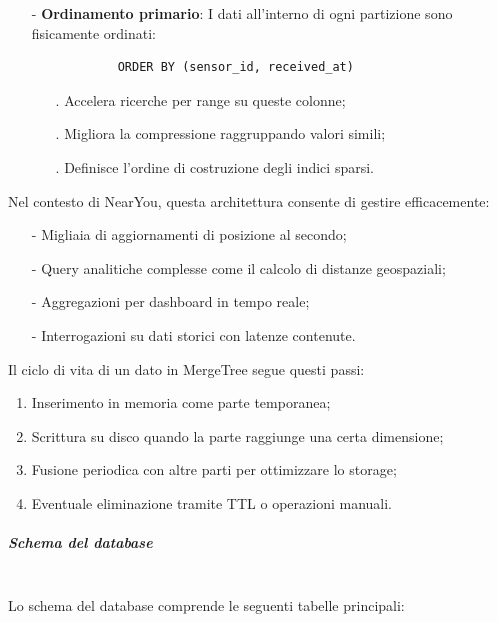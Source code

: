 \documentclass[10pt]{article}
\newcommand{\mysubparagraph}[1]{\subparagraph{#1}\mbox{}\\}
\begin{document}
\begin{itemize}
            \item[-] \textbf{Ordinamento primario}: I dati all'interno di ogni partizione sono fisicamente ordinati:
            \begin{lstlisting}
            ORDER BY (sensor_id, received_at)
            \end{lstlisting}
            \begin{itemize}
                \item[.] Accelera ricerche per range su queste colonne;
                \item[.] Migliora la compressione raggruppando valori simili;
                \item[.] Definisce l'ordine di costruzione degli indici sparsi.
            \end{itemize}
        \end{itemize}

        Nel contesto di NearYou, questa architettura consente di gestire efficacemente:
        \begin{itemize}
            \item[-] Migliaia di aggiornamenti di posizione al secondo;
            \item[-] Query analitiche complesse come il calcolo di distanze geospaziali;
            \item[-] Aggregazioni per dashboard in tempo reale;
            \item[-] Interrogazioni su dati storici con latenze contenute.
        \end{itemize}

        Il ciclo di vita di un dato in MergeTree segue questi passi:
        \begin{enumerate}
            \item Inserimento in memoria come parte temporanea;
            \item Scrittura su disco quando la parte raggiunge una certa dimensione;
            \item Fusione periodica con altre parti per ottimizzare lo storage;
            \item Eventuale eliminazione tramite TTL o operazioni manuali.
        \end{enumerate}

        \mysubparagraph{Schema del database}
        Lo schema del database comprende le seguenti tabelle principali:
\end{document}
